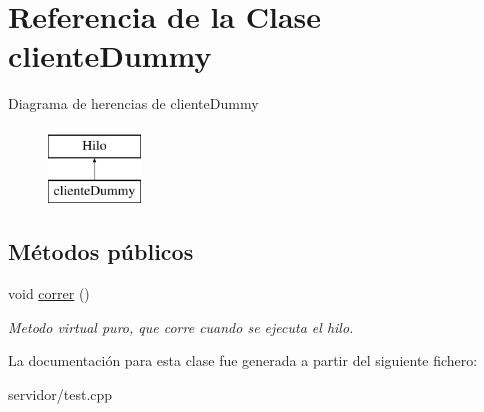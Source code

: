 \hypertarget{classclienteDummy}{\section{\-Referencia de la \-Clase cliente\-Dummy}
\label{classclienteDummy}
}
\-Diagrama de herencias de cliente\-Dummy\begin{figure}[H]
\begin{center}
\leavevmode
\includegraphics[height=2.000000cm]{classclienteDummy}
\end{center}
\end{figure}
\subsection*{\-Métodos públicos}
\begin{DoxyCompactItemize}
\item 
\hypertarget{classclienteDummy_abb424af4e83e2ec7e4d11d70caa9bcba}{void \hyperlink{classclienteDummy_abb424af4e83e2ec7e4d11d70caa9bcba}{correr} ()}\label{classclienteDummy_abb424af4e83e2ec7e4d11d70caa9bcba}

\begin{DoxyCompactList}\small\item\em \-Metodo virtual puro, que corre cuando se ejecuta el hilo. \end{DoxyCompactList}\end{DoxyCompactItemize}


\-La documentación para esta clase fue generada a partir del siguiente fichero\-:\begin{DoxyCompactItemize}
\item 
servidor/test.\-cpp\end{DoxyCompactItemize}
